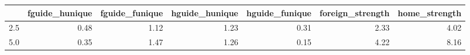 \begin{tabular}{lrrrrrr}
\toprule
 & fguide_hunique & fguide_funique & hguide_hunique & hguide_funique & foreign_strength & home_strength \\
\midrule
2.5 & 0.48 & 1.12 & 1.23 & 0.31 & 2.33 & 4.02 \\
5.0 & 0.35 & 1.47 & 1.26 & 0.15 & 4.22 & 8.16 \\
\bottomrule
\end{tabular}
